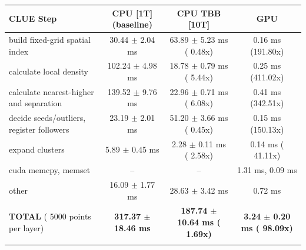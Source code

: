     \begin{tabular}{l|c|c|c}
    \hline
    CLUE Step                                 & CPU [1T] (baseline)         & CPU TBB [10T]                         & GPU                       \\ \hline
    build fixed-grid spatial index            &  30.44 $\pm$  2.04 ms       &  63.89 $\pm$  5.23 ms ( 0.48x)        &   0.16 ms (191.80x)       \\
    calculate local density                   & 102.24 $\pm$  4.98 ms       &  18.78 $\pm$  0.79 ms ( 5.44x)        &   0.25 ms (411.02x)       \\
    calculate nearest-higher and separation   & 139.52 $\pm$  9.76 ms       &  22.96 $\pm$  0.71 ms ( 6.08x)        &   0.41 ms (342.51x)       \\
    decide seeds/outliers, register followers &  23.19 $\pm$  2.01 ms       &  51.20 $\pm$  3.66 ms ( 0.45x)        &   0.15 ms (150.13x)       \\
    expand clusters                           &   5.89 $\pm$  0.45 ms       &   2.28 $\pm$  0.11 ms ( 2.58x)        &   0.14 ms ( 41.11x)       \\ \hline
    cuda memcpy, memset                       & --                          & --                                    &   1.31 ms,   0.09 ms      \\
    other                                     &  16.09 $\pm$  1.77 ms       &  28.63 $\pm$  3.42 ms                 &   0.72 ms                 \\ \hline
    \textbf{TOTAL} ( 5000 points per layer)   & \textbf{317.37 $\pm$ 18.46 ms} & \textbf{187.74 $\pm$ 10.64 ms ( 1.69x)} & \textbf{  3.24 $\pm$  0.20 ms ( 98.09x)}  \\
    \hline
    \multicolumn{4}{c}{}
    \end{tabular}
    \linebreak


